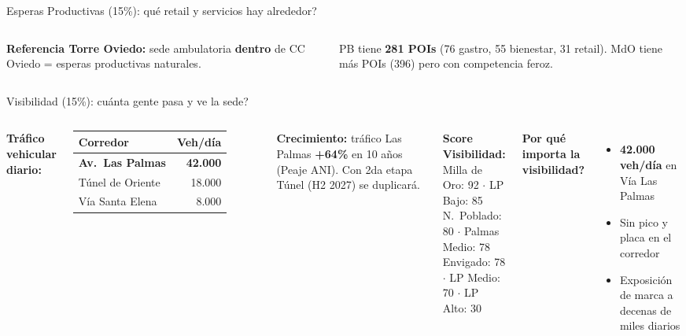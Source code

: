 \documentclass[aspectratio=169, 11pt]{beamer}
\begin{document}
\begin{frame}{\textcolor{esp}{Esperas Productivas (15\%)}: \textquestiondown qu\'{e} retail y servicios hay alrededor?}
\begin{columns}[T]
\vspace{3pt}
{\scriptsize\textbf{Referencia Torre Oviedo:} sede ambulatoria \textbf{dentro} de CC Oviedo = esperas productivas naturales.}

\vspace{2pt}
{\scriptsize PB tiene \textbf{281 POIs} (76 gastro, 55 bienestar, 31 retail). MdO tiene m\'{a}s POIs (396) pero con competencia feroz.}
\end{columns}
\end{frame}

\begin{frame}{\textcolor{vis}{Visibilidad (15\%)}: \textquestiondown cu\'{a}nta gente pasa y ve la sede?}

\begin{columns}[T]
\vspace{2pt}
{\scriptsize\textbf{Tr\'{a}fico vehicular diario:}}
\vspace{2pt}

{\scriptsize
\begin{tabular}{@{}lr@{}}
\toprule
\textbf{Corredor} & \textbf{Veh/d\'{i}a} \\
\midrule
\rowcolor{vis!8}
\textbf{Av.\ Las Palmas} & \textcolor{vis}{\textbf{42.000}} \\
T\'{u}nel de Oriente & 18.000 \\
\rowcolor{vis!6}
V\'{i}a Santa Elena & 8.000 \\
\bottomrule
\end{tabular}
}

\vspace{4pt}
{\scriptsize\textbf{Crecimiento:} tr\'{a}fico Las Palmas \textcolor{vis}{\textbf{+64\%}} en 10 a\~{n}os (Peaje ANI). Con 2da etapa T\'{u}nel (H2 2027) se duplicar\'{a}.}

\vspace{4pt}
{\scriptsize\textbf{Score Visibilidad:}\\
Milla de Oro: 92 $\cdot$ LP Bajo: 85\\
N.\ Poblado: 80 $\cdot$ Palmas Medio: 78\\
Envigado: 78 $\cdot$ LP Medio: 70 $\cdot$ LP Alto: 30}

\vspace{2pt}
{\scriptsize\textbf{\textquestiondown Por qu\'{e} importa la visibilidad?}}

\vspace{2pt}
{\scriptsize
\begin{itemize}\setlength{\itemsep}{1pt}
  \item \textbf{42.000 veh/d\'{i}a} en V\'{i}a Las Palmas
  \item Sin pico y placa en el corredor
  \item Exposici\'{o}n de marca a decenas de miles diarios
\end{itemize}
}


\end{columns}
\end{frame}
\end{document}
